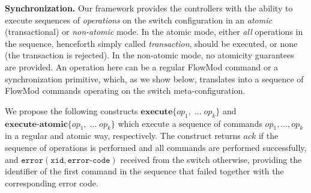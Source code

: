 \documentclass[conference]{sigcomm-alternate}
\newcommand{\hide}[1]{}
\newcommand{\petr}[1]{\textit{\textcolor{blue}{[petr]: #1}}} %
\newcommand{\error}{\texttt{error}}
\newcommand{\xid}{\texttt{xid}}
\newcommand{\ecode}{\texttt{error-code}}
\newcommand{\exec}{\textbf{execute}}
\newcommand{\execatomic}{\textbf{execute-atomic}}
\newcommand{\ack}{\textit{ack}}
\begin{document}
\vspace{1mm}
\noindent\textbf{Synchronization.}
Our framework provides the controllers with the ability to execute
sequences of \emph{operations} on the
switch configuration in an \emph{atomic} (transactional) or \emph{non-atomic} mode.
In the atomic mode, either \emph{all} operations in the sequence, henceforth simply
called \emph{transaction},
should be executed, or none (the transaction is rejected).
In the non-atomic mode, no atomicity guarantees are provided.
An operation here can be a regular FlowMod command or a synchronization
primitive, which, as we
show below, translates into a sequence of FlowMod commands operating on the
switch meta-configuration.

We propose the following constructs
$\exec\{op_1,\;\ldots\;op_k\}$ and $\execatomic\{op_1,\;\ldots\;op_k\}$
which execute a sequence of commands $op_1,\ldots,op_k$ in
a regular and atomic way, respectively.
The construct returns $\ack$ if the sequence of operations is performed and all commands are performed successfully, and
$\error(\xid,\ecode)$ received from the switch otherwise, providing
the identifier of the first command in the sequence that failed
together with the corresponding error code.



\hide{
Given this motivation, we now present a more powerful transactional interface.
At a high level, we aim to export a
transactional interface which allows each controller $i\in[N]$ ($N\geq
2$) to perform multiple
operations on the configuration of an OpenFlow switch as an atomic
\emph{transaction}, inspired by the transactional-memory paradigm~\cite{stm-st95,tm-book}. A transaction may \emph{commit}, in
which case it appears as executed sequentially, or \emph{abort}, in
which none of its operations takes effect.
}
\end{document}
